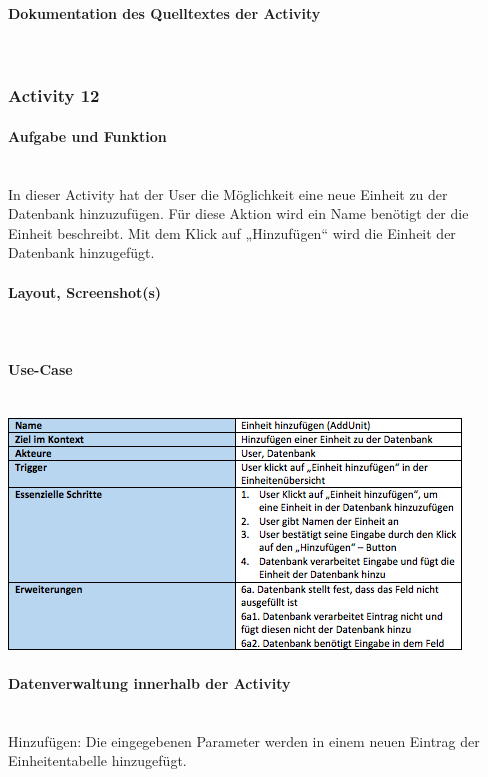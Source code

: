 \paragraph{Dokumentation des Quelltextes der Activity}\\

\subsubsection{Activity 12}

\paragraph{Aufgabe und Funktion}\\
In dieser Activity hat der User die Möglichkeit eine neue Einheit zu der Datenbank hinzuzufügen. Für diese Aktion wird ein Name benötigt der die Einheit beschreibt. Mit dem Klick auf „Hinzufügen“ wird die Einheit der Datenbank hinzugefügt.

\paragraph{Layout, Screenshot(s)}\\
\paragraph{Use-Case}$~~$\\
\newline
\includegraphics[scale=1]{img/usecaseaddunit}\\
\paragraph{Datenverwaltung innerhalb der Activity}\\
Hinzufügen: Die eingegebenen Parameter werden in einem neuen Eintrag der Einheitentabelle hinzugefügt.

